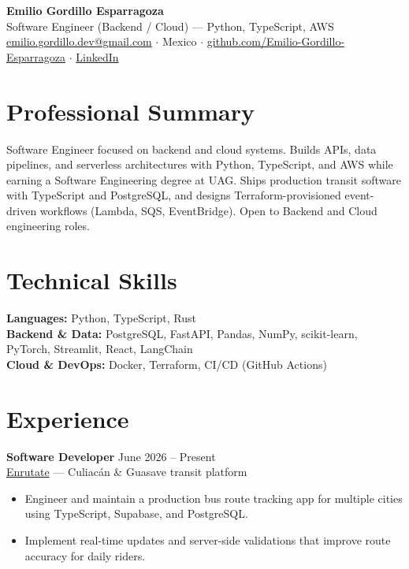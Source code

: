 \documentclass[10pt,a4paper]{article}
\begin{document}
\fontsize{9.5pt}{11.8pt}\selectfont

\begin{center}
    {\LARGE\textbf{Emilio Gordillo Esparragoza}}\\[3pt]
    Software Engineer (Backend / Cloud) --- Python, TypeScript, AWS\\[4pt]
    \href{mailto:emilio.gordillo.dev@gmail.com}{emilio.gordillo.dev@gmail.com}
    $\cdot$ Mexico
    $\cdot$ \href{https://github.com/Emilio-Gordillo-Esparragoza}{github.com/Emilio-Gordillo-Esparragoza}
    $\cdot$ \href{https://www.linkedin.com/in/emilio-gordillo-esparragoza-948267397/}{LinkedIn}
\end{center}

\section*{Professional Summary}
Software Engineer focused on backend and cloud systems. Builds APIs, data pipelines, and serverless architectures with Python, TypeScript, and AWS while earning a Software Engineering degree at UAG. Ships production transit software with TypeScript and PostgreSQL, and designs Terraform-provisioned event-driven workflows (Lambda, SQS, EventBridge). Open to Backend and Cloud engineering roles.

\section*{Technical Skills}
\textbf{Languages:} Python, TypeScript, Rust\\
\textbf{Backend \& Data:} PostgreSQL, FastAPI, Pandas, NumPy, scikit-learn, PyTorch, Streamlit, React, LangChain\\
\textbf{Cloud \& DevOps:} Docker, Terraform, CI/CD (GitHub Actions)

\section*{Experience}

\textbf{Software Developer} \hfill June 2026 -- Present\\
\href{https://www.enrutate.com/}{Enrutate} --- Culiac\'an \& Guasave transit platform\\
\begin{itemize}
    \item Engineer and maintain a production bus route tracking app for multiple cities using TypeScript, Supabase, and PostgreSQL.
    \item Implement real-time updates and server-side validations that improve route accuracy for daily riders.
\end{itemize}
\end{document}

